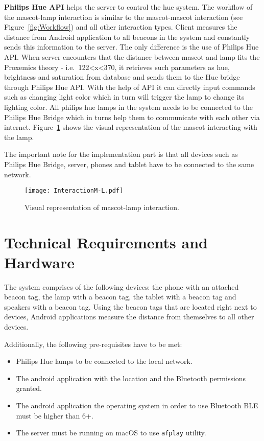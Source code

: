 \textbf{Philips Hue API} helps the server to control the hue system.
The workflow of the mascot-lamp interaction is similar to the mascot-mascot interaction (see Figure~\ref{fig:Workflow})
and all other interaction types.
Client measures the distance from Android application to all beacons
in the system and constantly sends this information to the server.
The only difference is the use of Philips Hue API\@.
When server encounters that the distance between mascot and lamp fits the Proxemics theory - i.e.\ 122<x<370, it
retrieves such parameters as hue, brightness and saturation from database and sends them
to the Hue bridge through Philips Hue API\@.
With the help of API it can directly input commands such as changing light color which in turn will trigger the lamp to
change its lighting color.
All philips hue lamps in the system needs to be connected to the Philips Hue Bridge which in turns help them
to communicate with each other via internet.
Figure~\ref{fig:InteractionMl} shows the visual representation of the mascot interacting with the lamp.

The important note for the implementation part is that all devices such as Philips Hue Bridge, server,
phones and tablet have to be connected to the same network.
\begin{figure}[hbt!]
    \centering
    \texttt{[image: InteractionM-L.pdf]}
    \caption{Visual representation of mascot-lamp interaction.}
    \label{fig:InteractionMl}
\end{figure}

\section{Technical Requirements and Hardware}
\label{sec:technical-requirements-and-hardware}
The system comprises of the following devices: the phone with an attached beacon tag,
the lamp with a beacon tag, the tablet with a beacon tag and speakers with a beacon tag.
Using the beacon tags that are located right next to devices, Android applications
measure the distance from themselves to all other devices.

Additionally, the following pre-requisites have to be met:
\begin{itemize}
    \item Philips Hue lamps to be connected to the local network.
    \item The android application with the location and the Bluetooth permissions granted.
    \item The android application the operating system in order to use Bluetooth BLE must be higher than 6+.
    \item The server must be running on macOS to use \texttt{afplay} utility.
\end{itemize}

